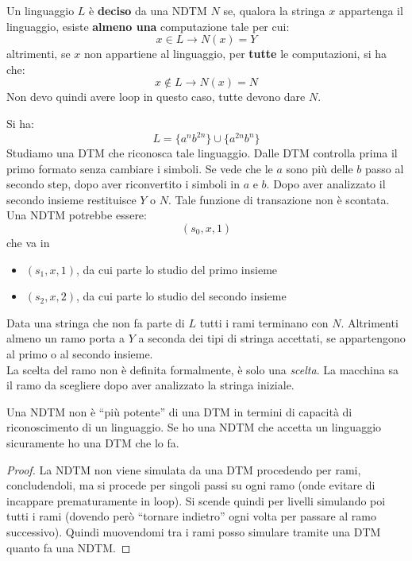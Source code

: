 \documentclass[a4paper,12pt, oneside]{book}
\begin{document}
\begin{definizione}
  Un linguaggio $L$ è \textbf{deciso} da una NDTM $N$ se, qualora la stringa $x$
  appartenga il linguaggio, esiste \textbf{almeno una} computazione tale per
  cui: 
  \[x\in L\rightarrow N(x)=Y\]
  altrimenti, se $x$ non appartiene al linguaggio, per \textbf{tutte} le
  computazioni, si ha che: 
  \[x\not\in L \rightarrow N(x)=N\]
  Non devo quindi avere loop in questo caso, tutte devono dare $N$.
\end{definizione}
\begin{esempio}
  Si ha:
  \[L=\{a^nb^{2n}\}\cup\{a^{2n}b^n\}\]
  Studiamo una DTM che riconosca tale linguaggio. Dalle DTM controlla prima il
  primo formato senza cambiare i simboli. Se vede che le $a$ sono più delle $b$
  passo al secondo step, dopo aver riconvertito i simboli in $a$ e $b$. Dopo
  aver analizzato il secondo insieme restituisce $Y$ o $N$. Tale funzione di
  transazione non è scontata.\\
  Una NDTM potrebbe essere:
  \[(s_0,x,1)\]
  che va in
  \begin{itemize}
    \item $(s_1,x,1)$, da cui parte lo studio del primo insieme
    \item $(s_2,x,2)$, da cui parte lo studio del secondo insieme
  \end{itemize}
  Data una stringa che non fa parte di $L$ tutti i rami terminano con
  $N$. Altrimenti almeno un ramo porta a $Y$ a seconda dei tipi di stringa
  accettati, se appartengono al primo o al secondo insieme. \\
  La scelta del ramo non è definita formalmente, è solo una \textit{scelta}. La
  macchina sa il ramo da scegliere dopo aver analizzato la stringa iniziale.
\end{esempio}
\begin{teorema}
  Una NDTM non è ``più potente'' di una DTM in termini di capacità di
  riconoscimento di un linguaggio. Se ho una NDTM che accetta un linguaggio
  sicuramente ho una DTM che lo fa.
\end{teorema}
\begin{proof}
  La NDTM non viene simulata da una DTM procedendo per rami, concludendoli, ma
  si procede per singoli passi su ogni ramo (onde evitare di incappare
  prematuramente in loop). Si scende quindi per livelli simulando poi tutti i
  rami (dovendo però ``tornare indietro'' ogni volta per passare al ramo
  successivo). Quindi muovendomi tra i rami posso simulare tramite una DTM
  quanto fa una NDTM.
\end{proof}
\end{document}
